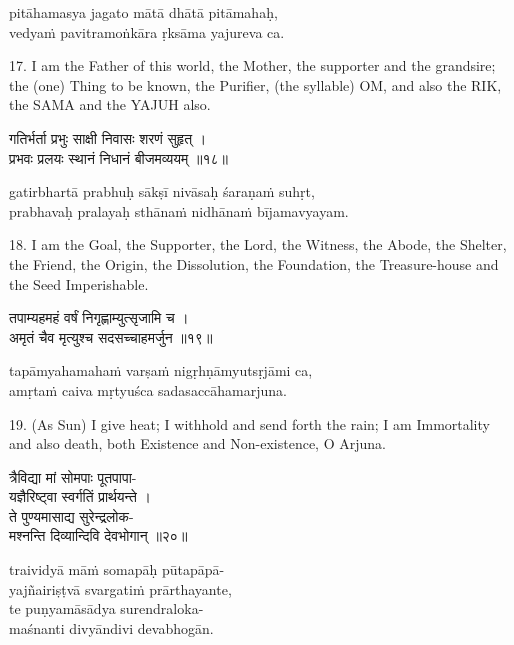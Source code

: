 \begin{transliteration}
pitāhamasya jagato mātā dhātā pitāmahaḥ, \\
vedyaṁ pavitramoṅkāra ṛksāma yajureva ca.
\end{transliteration}

17. I am the Father of this world, the Mother, the supporter and the grandsire;
the (one) Thing to be known, the Purifier, (the syllable) OM, and also the RIK,
the SAMA and the YAJUH also.

\begin{gitaverse}
गतिर्भर्ता प्रभुः साक्षी निवासः शरणं सुहृत् । \\
प्रभवः प्रलयः स्थानं निधानं बीजमव्ययम् ॥१८॥
\end{gitaverse}

\begin{transliteration}
gatirbhartā prabhuḥ sākṣī nivāsaḥ śaraṇaṁ suhṛt, \\
prabhavaḥ pralayaḥ sthānaṁ nidhānaṁ bījamavyayam.
\end{transliteration}

18. I am the Goal, the Supporter, the Lord, the Witness, the Abode, the
Shelter, the Friend, the Origin, the Dissolution, the Foundation, the
Treasure-house and the Seed Imperishable.

\begin{gitaverse}
तपाम्यहमहं वर्षं निगृह्णाम्युत्सृजामि च । \\
अमृतं चैव मृत्युश्च सदसच्चाहमर्जुन ॥१९॥
\end{gitaverse}

\begin{transliteration}
tapāmyahamahaṁ varṣaṁ nigṛhṇāmyutsṛjāmi ca, \\
amṛtaṁ caiva mṛtyuśca sadasaccāhamarjuna.
\end{transliteration}

19. (As Sun) I give heat; I withhold and send forth the rain; I am Immortality
and also death, both Existence and Non-existence, O Arjuna.

\begin{gitaverse}
त्रैविद्या मां सोमपाः पूतपापा- \\
\tab यज्ञैरिष्ट्वा स्वर्गतिं प्रार्थयन्ते । \\
ते पुण्यमासाद्य सुरेन्द्रलोक- \\
\tab मश्नन्ति दिव्यान्दिवि देवभोगान् ॥२०॥
\end{gitaverse}

\begin{transliteration}
traividyā māṁ somapāḥ pūtapāpā- \\
\tab yajñairiṣṭvā svargatiṁ prārthayante, \\
te puṇyamāsādya surendraloka- \\
\tab maśnanti divyāndivi devabhogān.
\end{transliteration}

